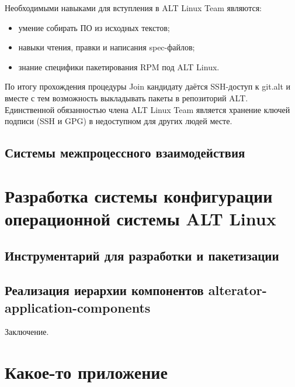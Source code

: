 \documentclass[bachelor, och, pract]{SCWorks}
\begin{document}
Необходимыми навыками для вступления в ALT Linux Team являются:
\begin{itemize}
    \item умение собирать ПО из исходных текстов;
    \item навыки чтения, правки и написания spec-файлов;
    \item знание специфики пакетирования RPM под ALT Linux.
\end{itemize}

По итогу прохождения процедуры Join кандидату даётся SSH-доступ к git.alt и вместе с тем возможность выкладывать пакеты в репозиторий ALT.
Единственной обязанностью члена ALT Linux Team является хранение ключей подписи (SSH и GPG) в недоступном для других людей месте.

\subsection{Системы межпроцессного взаимодействия}

\newpage

\section{Разработка системы конфигурации операционной системы ALT Linux}

\subsection{Инструментарий для разработки и пакетизации}

\subsection{Реализация иерархии компонентов alterator-application-components}

\newpage

\conclusion
Заключение.

%

%



\appendix

\section{Какое-то приложение}
\end{document}
